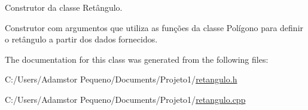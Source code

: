 Construtor da classe Retângulo. 

Construtor com argumentos que utiliza as funções da classe Polígono para definir o retângulo a partir dos dados fornecidos. 

The documentation for this class was generated from the following files\+:\begin{DoxyCompactItemize}
\item 
C\+:/\+Users/\+Adamstor Pequeno/\+Documents/\+Projeto1/\mbox{\hyperlink{retangulo_8h}{retangulo.\+h}}\item 
C\+:/\+Users/\+Adamstor Pequeno/\+Documents/\+Projeto1/\mbox{\hyperlink{retangulo_8cpp}{retangulo.\+cpp}}\end{DoxyCompactItemize}

